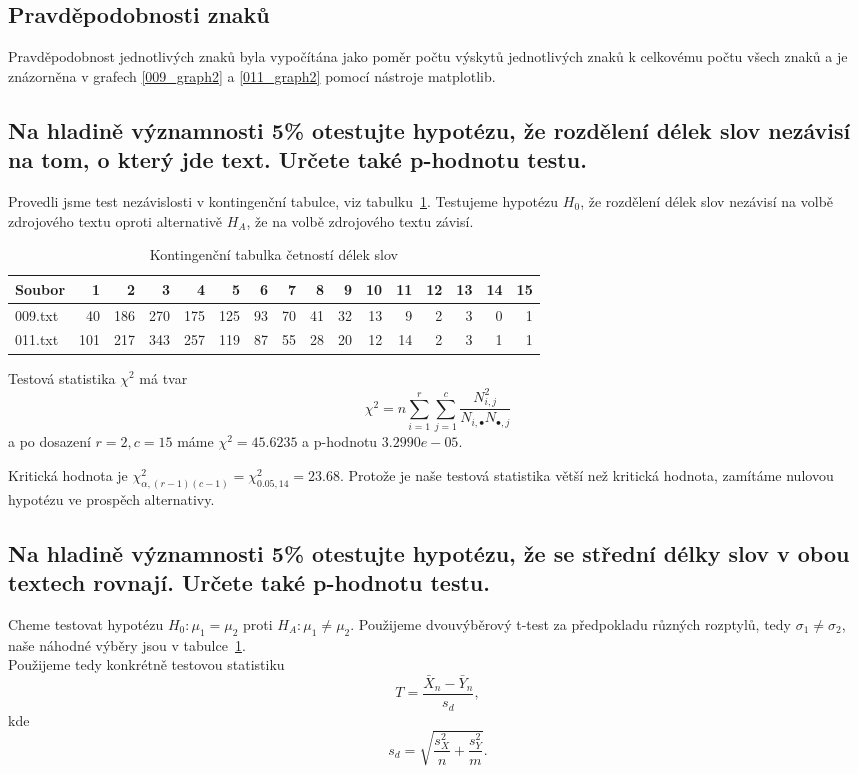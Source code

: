 \documentclass[12pt]{article}
\begin{document}
				\subsection{Pravděpodobnosti znaků}\label{pz}
			 Pravděpodobnost jednotlivých znaků byla vypočítána jako poměr počtu výskytů jednotlivých znaků k celkovému počtu všech znaků a je znázorněna v grafech \ref{009_graph2} a \ref{011_graph2} pomocí nástroje matplotlib.
						

    \subsection{Na hladině významnosti 5\% otestujte hypotézu, že rozdělení délek slov nezávisí na tom, o který jde
    text. Určete také p-hodnotu testu.} \label{ukol3}
		
   Provedli jsme test nezávislosti v kontingenční tabulce, viz tabulku~\ref{Cont_table1}. Testujeme hypotézu $H_0$, že rozdělení délek slov nezávisí na volbě zdrojového textu oproti alternativě $H_A$, že na volbě zdrojového textu závisí. \\
   
   \begin{table}[!ht]
    \centering
    \begin{tabular}{|l|rrrrrrrrrrrrrrr|} \hline
Soubor &  1  &   2  &   3  &   4  &   5  &  6  &  7  &  8  &  9  &  10 &  11 &  12 &  13 & 14 & 15 \\ \hline
009.txt &  40 &  186 &  270 &  175 &  125 &  93 &  70 &  41 &  32 &  13 &   9 &   2 &   3 & 0 &  1 \\ \hline
011.txt &  101 &  217 &  343 &  257 &  119 &  87 &  55 &  28 &  20 &  12 &  14 &   2 &   3 &   1 &   1 \\ \hline

\end{tabular}
\caption{Kontingenční tabulka četností délek slov}
\label{Cont_table1}
\end{table}

Testová statistika $\chi^2$ má tvar
$$\chi^2 = n\sum_{i =1}^r\sum_{j=1}^c \frac{N_{i,j}^2}{N_{i, \bullet}N_{\bullet, j}}$$
a po dosazení $r=2, c=15$ máme $\chi^2 = 45.6235$ a p-hodnotu $3.2990e-05$.

Kritická hodnota je $\chi^2_{\alpha, (r-1)(c-1)} = \chi^2_{0.05, 14} = 23.68$. Protože je naše testová statistika větší než kritická hodnota, zamítáme nulovou hypotézu ve prospěch alternativy.

\subsection{Na hladině významnosti 5\% otestujte hypotézu, že se střední délky slov v obou textech rovnají. Určete také p-hodnotu testu.}
Cheme testovat hypotézu $H_0: \mu_1 = \mu_2$ proti $H_A: \mu_1 \neq \mu_2$. Použijeme dvouvýběrový t-test za předpokladu
různých rozptylů, tedy $\sigma_1 \neq \sigma_2$, naše náhodné výběry jsou v tabulce~\ref{Cont_table1}.\\
Použijeme tedy konkrétně testovou statistiku 
$$T = \frac{\bar{X}_n - \bar{Y}_n}{s_d},$$
kde
$$s_d = \sqrt{\frac{s_X^2}{n}+\frac{s_Y^2}{m}}.$$
\end{document}
